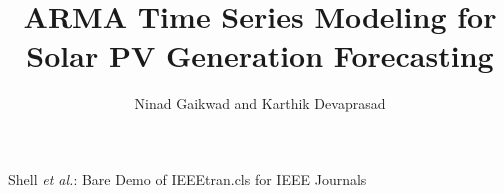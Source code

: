 \documentclass[journal]{IEEEtran}
\begin{document}
%
\title{ARMA Time Series Modeling for Solar PV Generation Forecasting}
%
%
%

\author{Ninad Gaikwad and Karthik Devaprasad}

% 
%



%
{Shell \MakeLowercase{\textit{et al.}}: Bare Demo of IEEEtran.cls for IEEE Journals}
% 
\end{document}
